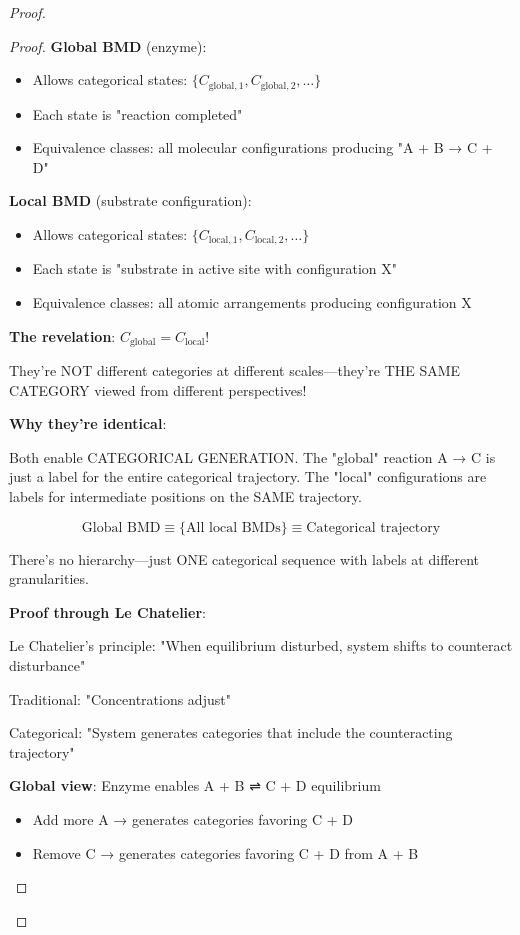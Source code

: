 \documentclass[11pt,a4paper]{article}
\begin{document}
\begin{proof}
\begin{proof}
\textbf{Global BMD} (enzyme):
\begin{itemize}
\item Allows categorical states: $\{C_{\text{global},1}, C_{\text{global},2}, \ldots\}$
\item Each state is "reaction completed"
\item Equivalence classes: all molecular configurations producing "A + B → C + D"
\end{itemize}

\textbf{Local BMD} (substrate configuration):
\begin{itemize}
\item Allows categorical states: $\{C_{\text{local},1}, C_{\text{local},2}, \ldots\}$
\item Each state is "substrate in active site with configuration X"
\item Equivalence classes: all atomic arrangements producing configuration X
\end{itemize}

\textbf{The revelation}: $C_{\text{global}} = C_{\text{local}}$!

They're NOT different categories at different scales—they're THE SAME CATEGORY viewed from different perspectives!

\textbf{Why they're identical}:

Both enable CATEGORICAL GENERATION. The "global" reaction A → C is just a label for the entire categorical trajectory. The "local" configurations are labels for intermediate positions on the SAME trajectory.

\begin{equation}
\text{Global BMD} \equiv \{\text{All local BMDs}\} \equiv \text{Categorical trajectory}
\end{equation}

There's no hierarchy—just ONE categorical sequence with labels at different granularities.

\textbf{Proof through Le Chatelier}:

Le Chatelier's principle: "When equilibrium disturbed, system shifts to counteract disturbance"

Traditional: "Concentrations adjust"

Categorical: "System generates categories that include the counteracting trajectory"

\textbf{Global view}: Enzyme enables A + B ⇌ C + D equilibrium
\begin{itemize}
\item Add more A → generates categories favoring C + D
\item Remove C → generates categories favoring C + D from A + B
\end{itemize}


\end{proof}
\end{proof}
\end{document}
